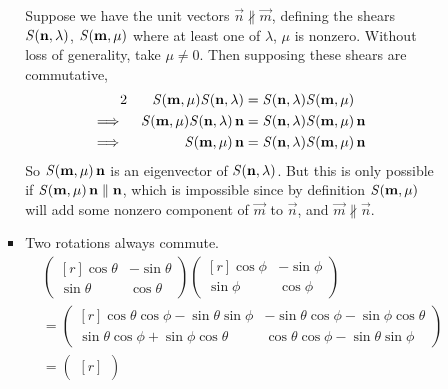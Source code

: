 \documentclass[fleqn,a4paper,11pt]{article}
\begin{document}
\begin{enumerate}[label=\textbf{\arabic*.}]
\begin{enumerate}[label=(\alph*)]
\begin{itemize}
\begin{itemize}
          Suppose we have the unit vectors
          \(\vec n \nparallel \vec m\), defining the shears
          \(\mathit{S}(\mathrm{\mathbf{n}}, \lambda)\), \(\mathit{S}(\mathrm{\mathbf{m}}, \mu)\) where at least
          one of \(\lambda\), \(\mu\) is nonzero. Without loss of generality,
          take \(\mu \ne 0\). Then supposing these shears are commutative,
          \begin{alignat*}2
           && \mat S(\vec m, \mu) \mat S(\vec n, \lambda)
            &= \mat S(\vec n, \lambda) \mat S(\vec m, \mu) \\
           \implies{}&&
            \mat S(\vec m, \mu) \mat S(\vec n, \lambda)\,\vec n
            &= \mat S(\vec n, \lambda) \mat S(\vec m, \mu)\,\vec n \\
           \implies{}&&
            \mat S(\vec m, \mu)\,\vec n
            &= \mat S(\vec n, \lambda) \mat S(\vec m, \mu)\,\vec n
          \end{alignat*}
          So \(\mathit{S}(\mathrm{\mathbf{m}}, \mu)\,\mathrm{\mathbf{n}}\) is an eigenvector of
          \(\mathit{S}(\mathrm{\mathbf{n}}, \lambda)\). But this is only possible if
          \(\mathit{S}(\mathrm{\mathbf{m}}, \mu)\,\mathrm{\mathbf{n}} \parallel \mathrm{\mathbf{n}}\), which is impossible
          since by definition \(\mathit{S}(\mathrm{\mathbf{m}}, \mu)\) will add some nonzero
          component of \(\vec m\) to \(\vec n\), and
          \(\vec m \nparallel \vec n\).
         \item
          Two rotations always commute.
          \begin{align*}
           &\begin{pmatrix*}[r]
            \cos \theta & -\sin \theta \\
            \sin \theta & \cos \theta
           \end{pmatrix*}
           \begin{pmatrix*}[r]
            \cos \phi & -\sin \phi \\
            \sin \phi & \cos \phi
           \end{pmatrix*} \\
           &=
           \begin{pmatrix*}[r]
            \cos \theta \cos \phi - \sin \theta \sin \phi
             & -\sin \theta \cos \phi - \sin \phi \cos \theta  \\
            \sin \theta \cos \phi + \sin \phi \cos \theta
             & \cos \theta \cos \phi - \sin \theta \sin \phi
           \end{pmatrix*} \\
           &=
           \begin{pmatrix*}[r]

\end{pmatrix*}
\end{align*}
\end{itemize}
\end{itemize}
\end{enumerate}
\end{enumerate}
\end{document}
